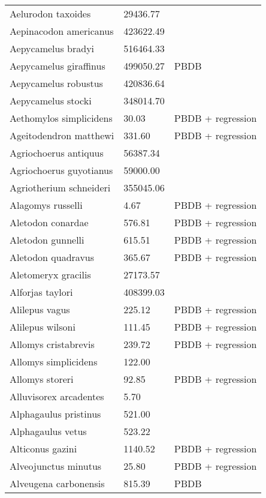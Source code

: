 \begin{center}
\begin{longtable}{p{} p{} p{} }
  Aelurodon taxoides & 29436.77 & \cite{Tomiya2013} \\ 
  Aepinacodon americanus & 423622.49 & \cite{Baskin2011} \\ 
  Aepycamelus bradyi & 516464.33 & \cite{Dawson2012} \\ 
  Aepycamelus giraffinus & 499050.27 & PBDB \\ 
  Aepycamelus robustus & 420836.64 & \cite{Tomiya2013} \\ 
  Aepycamelus stocki & 348014.70 & \cite{Tomiya2013} \\ 
  Aethomylos simplicidens & 30.03 & PBDB + regression \\ 
  Ageitodendron matthewi & 331.60 & PBDB + regression \\ 
  Agriochoerus antiquus & 56387.34 & \cite{Tomiya2013} \\ 
  Agriochoerus guyotianus & 59000.00 & \cite{McKenna2011} \\ 
  Agriotherium schneideri & 355045.06 & \cite{Tomiya2013} \\ 
  Alagomys russelli & 4.67 & PBDB + regression \\ 
  Aletodon conardae & 576.81 & PBDB + regression \\ 
  Aletodon gunnelli & 615.51 & PBDB + regression \\ 
  Aletodon quadravus & 365.67 & PBDB + regression \\ 
  Aletomeryx gracilis & 27173.57 & \cite{Tomiya2013} \\ 
  Alforjas taylori & 408399.03 & \cite{Tomiya2013} \\ 
  Alilepus vagus & 225.12 & PBDB + regression \\ 
  Alilepus wilsoni & 111.45 & PBDB + regression \\ 
  Allomys cristabrevis & 239.72 & PBDB + regression \\ 
  Allomys simplicidens & 122.00 & \cite{McKenna2011} \\ 
  Allomys storeri & 92.85 & PBDB + regression \\ 
  Alluvisorex arcadentes & 5.70 & \cite{Tomiya2013} \\ 
  Alphagaulus pristinus & 521.00 & \cite{McKenna2011} \\ 
  Alphagaulus vetus & 523.22 & \cite{Tomiya2013} \\ 
  Alticonus gazini & 1140.52 & PBDB + regression \\ 
  Alveojunctus minutus & 25.80 & PBDB + regression \\ 
  Alveugena carbonensis & 815.39 & PBDB \\ 

\end{longtable}
\end{center}
